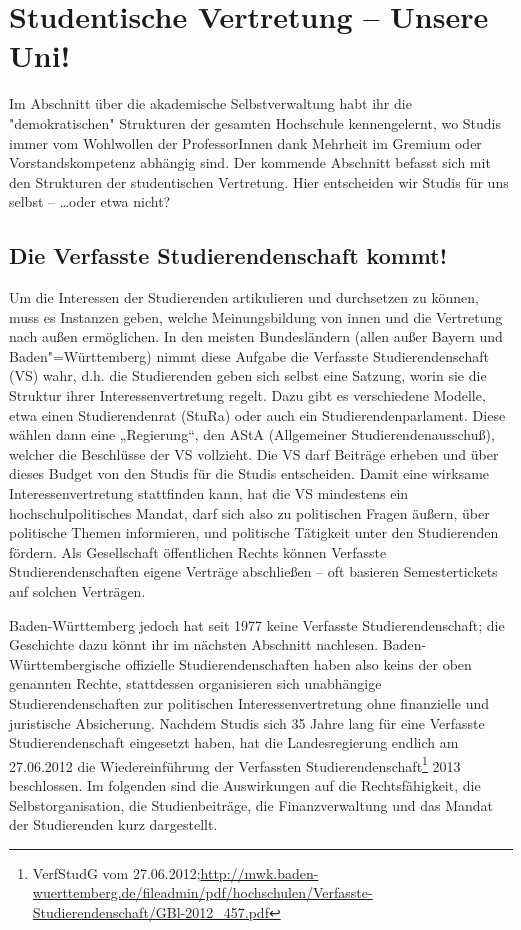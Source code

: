 \section{Studentische Vertretung -- Unsere Uni!}

Im Abschnitt über die akademische Selbstverwaltung habt ihr die "demokratischen" Strukturen der gesamten Hochschule kennengelernt, wo Studis immer vom Wohlwollen der ProfessorInnen dank Mehrheit im Gremium oder Vorstandskompetenz abhängig sind. Der kommende Abschnitt befasst sich mit den Strukturen der studentischen Vertretung. Hier entscheiden wir Studis für uns selbst -- \dots oder etwa nicht?

\subsection{Die Verfasste Studierendenschaft kommt!}

Um die Interessen der Studierenden artikulieren und durchsetzen zu können, muss es Instanzen geben, welche Meinungsbildung von innen und die Vertretung nach außen ermöglichen. In den meisten Bundesländern (allen außer Bayern und Baden"=Württemberg) nimmt diese Aufgabe die Verfasste Studierendenschaft (VS) wahr, d.h. die Studierenden geben sich selbst eine Satzung, worin sie die Struktur ihrer Interessenvertretung regelt. Dazu gibt es verschiedene Modelle, etwa einen Studierendenrat (StuRa) oder auch ein Studierendenparlament. Diese wählen dann eine „Regierung“, den AStA (Allgemeiner Studierendenausschuß), welcher die Beschlüsse der VS vollzieht. Die VS darf Beiträge erheben und über dieses Budget von den Studis für die Studis entscheiden. Damit eine wirksame Interessenvertretung stattfinden kann, hat die VS mindestens ein hochschulpolitisches Mandat, darf sich also zu politischen Fragen äußern, über politische Themen informieren, und politische Tätigkeit unter den Studierenden fördern. Als Gesellschaft öffentlichen Rechts können Verfasste Studierendenschaften eigene Verträge abschließen -- oft basieren Semestertickets auf solchen Verträgen.

Baden-Württemberg jedoch hat seit 1977 keine Verfasste Studierendenschaft; die Geschichte dazu könnt ihr im nächsten Abschnitt nachlesen. Baden-Württembergische offizielle Studierendenschaften haben also keins der oben genannten Rechte, stattdessen organisieren sich unabhängige Studierendenschaften zur politischen Interessenvertretung ohne finanzielle und juristische Absicherung. Nachdem Studis sich 35 Jahre lang für eine Verfasste Studierendenschaft eingesetzt haben, hat die Landesregierung endlich am 27.06.2012 die Wiedereinführung der Verfassten Studierendenschaft\footnote{VerfStudG vom 27.06.2012;\url{http://mwk.baden-wuerttemberg.de/fileadmin/pdf/hochschulen/Verfasste-Studierendenschaft/GBl-2012_457.pdf}} 2013 beschlossen. Im folgenden sind die Auswirkungen auf die Rechtsfähigkeit, die Selbstorganisation, die Studienbeiträge, die Finanzverwaltung und das Mandat der Studierenden kurz dargestellt. 

